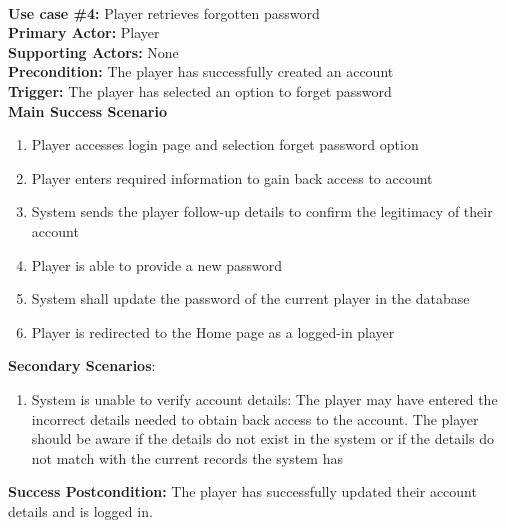 \documentclass{article}
\begin{document}
\noindent\\
\textbf{Use case \#4:} Player retrieves forgotten password\\
\textbf{Primary Actor:} Player\\
\textbf{Supporting Actors:} None\\
\textbf{Precondition:} The player has successfully created an account\\
\textbf{Trigger:} The player has selected an option to forget password\\
\textbf{Main Success Scenario}
\begin{enumerate}
    \item Player accesses login page and selection forget password option
    \item Player enters required information to gain back access to account
    \item System sends the player follow-up details to confirm the legitimacy of their account
    \item Player is able to provide a new password
    \item System shall update the password of the current player in the database 
    \item Player is redirected to the Home page as a logged-in player
\end{enumerate}
\textbf{Secondary Scenarios}:
\begin{enumerate}
    \item System is unable to verify account details: The player may have entered the incorrect details needed to obtain back access to the account. The player should be aware if the details do not exist in the system or if the details do not match with the current records the system has
\end{enumerate}
\textbf{Success Postcondition:} The player has successfully updated their account details and is logged in. \newline
\end{document}
